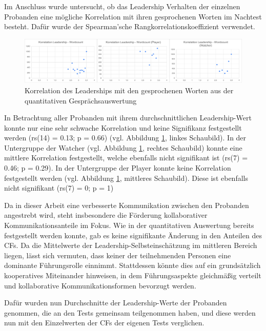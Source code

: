 Im Anschluss wurde untersucht, ob das Leadership Verhalten der einzelnen Probanden eine mögliche Korrelation mit ihren gesprochenen Worten im Nachtest besteht. Dafür wurde der Spearman'sche Rangkorrelationskoeffizient verwendet.

\begin{figure}[ht]
\centering
\includegraphics[width=1\linewidth]{content/pictures/Korrelation_Leadership_Wordcount_full.png}
\caption{Korrelation des Leaderships mit den gesprochenen Worten aus der quantitativen Gesprächsauswertung}
\label{fig:correlation_leadership_wordcount}
\end{figure}

In Betrachtung aller Probanden mit ihrem durchschnittlichen Leadership-Wert konnte nur eine sehr schwache Korrelation und keine Signifikanz festgestellt werden (rs(14) = 0.13; p = 0.66) (vgl. Abbildung \ref{fig:correlation_leadership_wordcount}, linkes Schaubild). In der Untergruppe der Watcher (vgl. Abbildung \ref{fig:correlation_leadership_wordcount}, rechtes Schaubild) konnte eine mittlere Korrelation festgestellt, welche ebenfalls nicht signifikant ist (rs(7) = 0.46; p = 0.29). In der Untergruppe der Player konnte keine Korrelation festgestellt werden (vgl. Abbildung \ref{fig:correlation_leadership_wordcount}, mittleres Schaubild). Diese ist ebenfalls nicht signifikant (rs(7) = 0; p = 1)

Da in dieser Arbeit eine verbesserte Kommunikation zwischen den Probanden angestrebt wird, steht insbesondere die Förderung kollaborativer Kommunikationsanteile im Fokus. Wie in der quantitativen Auswertung bereits festgestellt werden konnte, gab es keine signifikante Änderung in den Anteilen des \ac{CF}s. Da die Mittelwerte der Leadership-Selbsteinschätzung im mittleren Bereich liegen, lässt sich vermuten, dass keiner der teilnehmenden Personen eine dominante Führungsrolle einnimmt. Stattdessen könnte dies auf ein grundsätzlich kooperatives Miteinander hinweisen, in dem Führungsaspekte gleichmäßig verteilt und kollaborative Kommunikationsformen bevorzugt werden.

Dafür wurden nun Durchschnitte der Leadership-Werte der Probanden genommen, die an den Tests gemeinsam teilgenommen haben, und diese werden nun mit den Einzelwerten der \ac{CF}s der eigenen Tests verglichen.

